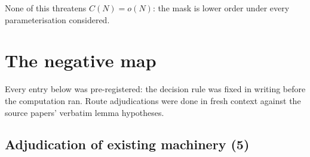 \documentclass[11pt,a4paper]{article}
\theoremstyle{plain}
\theoremstyle{definition}
\begin{document}
None of this threatens $C(N)=o(N)$: the mask is lower order under every
parameterisation considered.

\section{The negative map}\label{sec:closures}

Every entry below was pre-registered: the decision rule was fixed in
writing before the computation ran. Route adjudications were done in
fresh context against the source papers' verbatim lemma hypotheses.

\subsection{Adjudication of existing machinery (5)}
\end{document}
